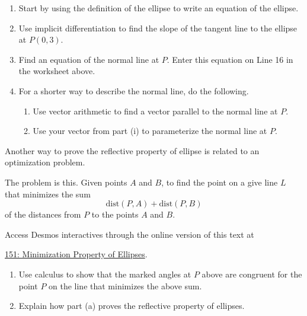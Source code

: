 \documentclass{ximera}
\begin{document}
\begin{question}
\begin{enumerate}
\item Start by using the definition of the ellipse to write an equation of the ellipse.

\item Use implicit differentiation to find the slope of the tangent line to the ellipse at $P(0,3)$.

\item Find an equation of the normal line at $P$. Enter this equation on Line 16 in the worksheet above. 

\item For a shorter way to describe the normal line, do the following.

\begin{enumerate}
\item Use vector arithmetic to find a vector parallel to the normal line at $P$.

\item Use your vector from part (i) to parameterize the normal line at $P$.

\end{enumerate}
\end{enumerate}
\end{question}


\begin{question}  \label{Q5445rggfbhyhyrdt}

Another way to prove the reflective property of ellipse is related to an optimization problem.

The problem is this. Given points $A$ and $B$, to find the point on a give line $L$ that minimizes the sum 
\[
   \text{dist}(P,A) + \text{dist}(P,B)
\]
of the distances from $P$ to the points $A$ and $B$.

\begin{onlineOnly}
    \begin{center}
\end{center}
\end{onlineOnly}

Access Desmos interactives through the online version of this text at
 
\href{https://https://www.desmos.com/calculator/vxqdjba3hm}{151: Minimization Property of Ellipses}.

\begin{enumerate}
\item Use calculus to show that the marked angles at $P$ above are congruent for the point $P$ on the line that minimizes the above sum.

\item Explain how part (a) proves the reflective property of ellipses.
\end{enumerate}


\end{question}
\end{document}
